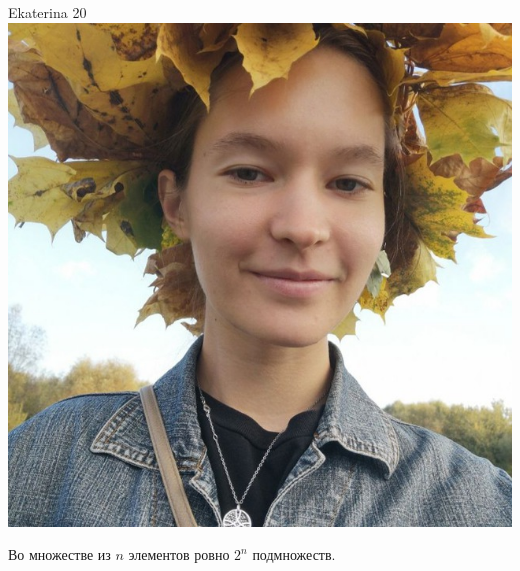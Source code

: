 \documentclass[12pt]{article}
\begin{document}
\begin{minipage}{0.45\textwidth}
\begin{tinderf}{Ekaterina 20}
\includegraphics[width=\textwidth]{tinder-photo/ekaterina.jpg}

  

\begin{mybox}
Во множестве из $n$ элементов ровно $2^n$ подмножеств. 
\end{mybox}
\end{tinderf}
\end{minipage}
%
%
\end{document}
